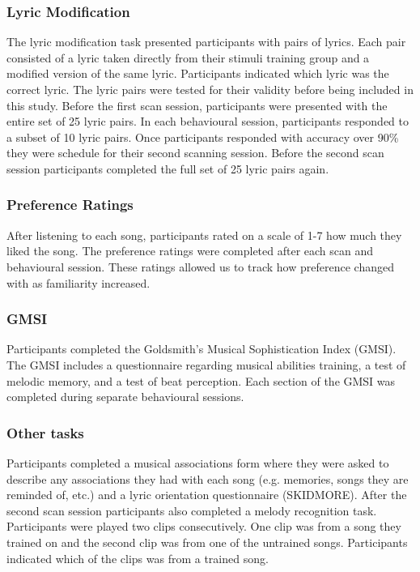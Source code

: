 \documentclass[12pt,letterpaper]{report}
\begin{document}
\subsubsection{Lyric Modification}
The lyric modification task presented participants with pairs of lyrics.
Each pair consisted of a lyric taken directly from their stimuli training group and a modified version of the same lyric. 
Participants indicated which lyric was the correct lyric.
The lyric pairs were tested for their validity before being included in this study. 
Before the first scan session, participants were presented with the entire set of 25 lyric pairs.
In each behavioural session, participants responded to a subset of 10 lyric pairs. 
Once participants responded with accuracy over 90\% they were schedule for their second scanning session.
Before the second scan session participants completed the full set of 25 lyric pairs again. 
\subsubsection{Preference Ratings}
After listening to each song, participants rated on a scale of 1-7 how much they liked the song.
The preference ratings were completed after each scan and behavioural session. 
These ratings allowed us to track how preference changed with as familiarity increased.
\subsubsection{GMSI}
Participants completed the Goldsmith's Musical Sophistication Index (GMSI).
The GMSI includes a questionnaire regarding musical abilities training, a test of melodic memory, and a test of beat perception.
Each section of the GMSI was completed during separate behavioural sessions. 
\subsubsection{Other tasks}
Participants completed a musical associations form where they were asked to describe any associations they had with each song (e.g. memories, songs they are reminded of, etc.) and a lyric orientation questionnaire (SKIDMORE). 
After the second scan session participants also completed a melody recognition task. 
Participants were played two clips consecutively. 
One clip was from a song they trained on and the second clip was from one of the untrained songs. 
Participants indicated which of the clips was from a trained song.
\end{document}
